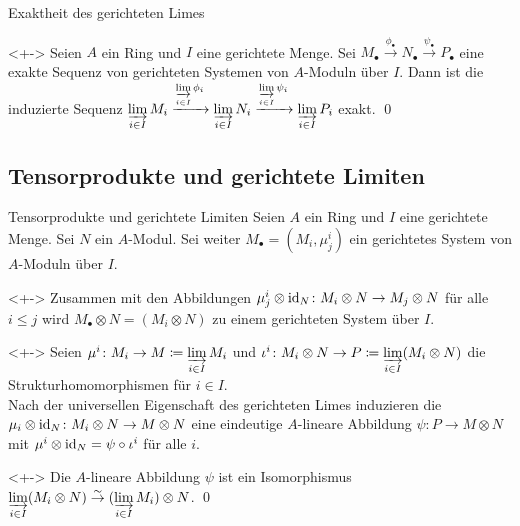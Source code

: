 \begin{frame}{Exaktheit des gerichteten Limes}
	\begin{proposition}<+->
		Seien \(A\) ein Ring und \(I\) eine gerichtete Menge. Sei
		\(M_\bullet \xrightarrow{\phi_\bullet} N_\bullet \xrightarrow{\psi_\bullet}
		P_\bullet\) eine exakte Sequenz von gerichteten Systemen von \(A\)-Moduln über \(I\).
		Dann ist die induzierte Sequenz
		\(\varinjlim\limits_{i \in I} M_i \xrightarrow{\varinjlim\limits_{i \in I} \phi_i}
		\varinjlim\limits_{i \in I} N_i \xrightarrow{\varinjlim\limits_{i \in I} \psi_i}
		\varinjlim\limits_{i \in I} P_i\)
		exakt.
		\qed
	\end{proposition}
\end{frame}

\subsection{Tensorprodukte und gerichtete Limiten}

\begin{frame}{Tensorprodukte und gerichtete Limiten}
	Seien \(A\) ein Ring und \(I\) eine gerichtete Menge. Sei \(N\) ein \(A\)-Modul.
	Sei weiter \(M_\bullet = (M_i, \mu^i_j)\) ein gerichtetes System von \(A\)-Moduln über \(I\).
	\begin{example}<+->
		Zusammen mit den Abbildungen \(\mu^i_j \otimes \operatorname{id}_N\colon M_i \otimes N \to M_j \otimes N\) für
		alle \(i \le j\) wird \(M_\bullet \otimes N = (M_i \otimes N)\) zu einem gerichteten System über \(I\).
	\end{example}
	\begin{visibleenv}<+->
		Seien \(\mu^i\colon M_i \to M \coloneqq \varinjlim\limits_{i \in I} M_i\) 
		und \(\iota^i\colon M_i \otimes N \to P \coloneqq \varinjlim\limits_{i \in I} (M_i \otimes N)\)
		die Strukturhomomorphismen für \(i \in I\).
		\\
		Nach der universellen Eigenschaft des gerichteten Limes induzieren die \(\mu_i \otimes \operatorname{id}_N\colon M_i \otimes N \to
		M \otimes N\) eine eindeutige \(A\)-lineare Abbildung \(\psi\colon P
		\to M \otimes N\) mit \(\mu^i \otimes \operatorname{id}_N = \psi \circ \iota^i\) für alle \(i\).
	\end{visibleenv}
	\begin{proposition}<+->
		Die \(A\)-lineare Abbildung \(\psi\) ist ein Isomorphismus
		\(\varinjlim\limits_{i \in I} (M_i \otimes N) \stackrel\sim\to (\varinjlim\limits_{i \in I} M_i) \otimes N\).
		\qed
	\end{proposition}
\end{frame}

